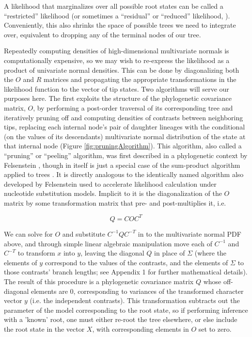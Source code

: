\documentclass[10pt, twocolumn, twoside]{article}
\begin{document}
A likelihood that marginalizes over all possible root states can be called a “restricted” likelihood (or sometimes a “residual” or “reduced” likelihood, \citealt{felsensteinInferringPhylogenies2004}). Conveniently, this also shrinks the space of possible trees we need to integrate over, equivalent to dropping any of the terminal nodes of our tree.

Repeatedly computing densities of high-dimensional multivariate normals is computationally expensive, so we may wish to re-express the likelihood as a product of univariate normal densities. This can be done by diagonalizing both the $O$ and $R$ matrices and propagating the appropriate transformations in the likelihood function to the vector of tip states. Two algorithms will serve our purposes here. The first exploits the structure of the phylogenetic covariance matrix, $O$, by performing a post-order traversal of its corresponding tree and iteratively pruning off and computing densities of contrasts between neighboring tips, replacing each internal node’s pair of daughter lineages with the conditional (on the values of its descendants) multivariate normal distribution of the state at that internal node (Figure \ref{fig:pruningAlgorithm}). This algorithm, also called a “pruning” or “peeling” algorithm, was first described in a phylogenetic context by Felsenstein \citeyear{felsensteinMaximumlikelihoodEstimationEvolutionary1973, felsensteinPhylogeniesComparativeMethod1985, felsensteinInferringPhylogenies2004}, though in itself is just a special case of the sum-product algorithm applied to trees \citep{hohnaProbabilisticGraphicalModel2014}. It is directly analogous to the identically named algorithm also developed by Felsenstein used to accelerate likelihood calculation under nucleotide substitution models. Implicit to it is the diagonalization of the $O$ matrix by some transformation matrix that pre- and post-multiplies it, i.e.

{\large\[Q = COC^T\]}

We can solve for $O$ and substitute $C^{-1}QC^{-T}$ in to the multivariate normal PDF above, and through simple linear algebraic manipulation move each of $C^{-1}$ and $C^{-T}$ to transform $x$ into $y$, leaving the diagonal $Q$ in place of $\Sigma$ (where the elements of $y$ correspond to the values of the contrasts, and the elements of $\Sigma$ to those contrasts' branch lengths; see Appendix 1 for further mathematical details). The result of this procedure is a phylogenetic covariance matrix $Q$ whose off-diagonal elements are 0, corresponding to variances of the transformed character vector $y$ (i.e. the independent contrasts). This transformation subtracts out the parameter of the model corresponding to the root state, so if performing inference with a 'known' root, one must either re-root the tree elsewhere, or else include the root state in the vector $X$, with corresponding elements in $O$ set to zero.
\end{document}
